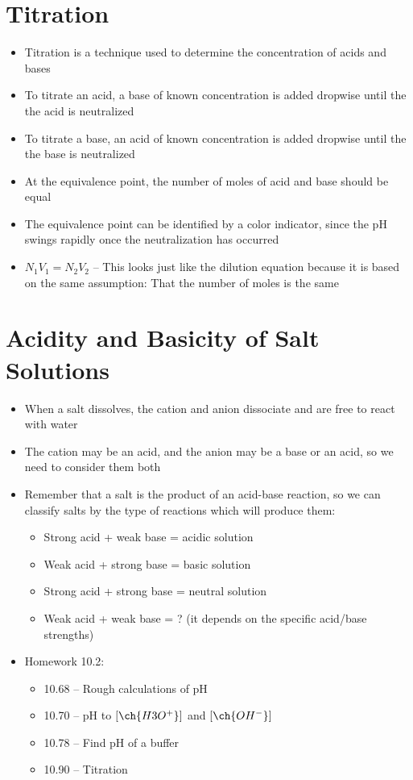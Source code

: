 \documentclass[12pt, openany, letterpaper]{memoir}
\begin{document}
\section{Titration}
\begin{itemize}
	\item Titration is a technique used to determine the concentration of acids and bases
	\item To titrate an acid, a base of known concentration is added dropwise until the the acid is neutralized
	\item To titrate a base, an acid of known concentration is added dropwise until the the base is neutralized
	\item At the equivalence point, the number of moles of acid and base should be equal
	\item The equivalence point can be identified by a color indicator, since the pH swings rapidly once the neutralization has occurred
	\item $N_1V_1=N_2V_2$ -- This looks just like the dilution equation because it is based on the same assumption: That the number of moles is the same
\end{itemize}
\section{Acidity and Basicity of Salt Solutions}
\begin{itemize}
	\item When a salt dissolves, the cation and anion dissociate and are free to react with water
	\item The cation may be an acid, and the anion may be a base or an acid, so we need to consider them both
	\item Remember that a salt is the product of an acid-base reaction, so we can classify salts by the type of reactions which will produce them:
	\begin{itemize}
		\item Strong acid + weak base = acidic solution
		\item Weak acid + strong base = basic solution
		\item Strong acid + strong base = neutral solution
		\item Weak acid + weak base = ? (it depends on the specific acid/base strengths)
	\end{itemize}
	\item Homework 10.2:
	\begin{itemize}
		\item 10.68 -- Rough calculations of pH
		\item 10.70 -- pH to $\left[\ch{H3O^+}\right]$ and $\left[\ch{OH^-}\right]$ 
		\item 10.78 -- Find pH of a buffer
		\item 10.90 -- Titration
	\end{itemize}
\end{itemize}
\end{document}
